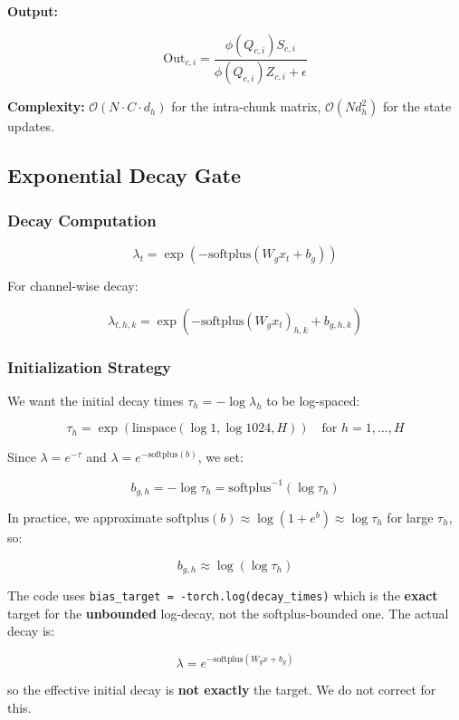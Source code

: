 \textbf{Output:}

\[
\text{Out}_{c, i} = \frac{\phi(Q_{c, i}) S_{c, i}}{\phi(Q_{c, i}) Z_{c, i} + \epsilon}
\tag{4.9}
\]

\textbf{Complexity:} $\mathcal{O}(N \cdot C \cdot d_h)$ for the intra-chunk matrix, 
$\mathcal{O}(N d_h^2)$ for the state updates.

\subsection{Exponential Decay Gate}

\subsubsection{Decay Computation}

\[
\lambda_t = \exp(-\text{softplus}(W_g x_t + b_g))
\tag{4.10}
\]

For channel-wise decay:

\[
\lambda_{t, h, k} = \exp(-\text{softplus}(W_g x_t)_{h, k} + b_{g, h, k})
\tag{4.11}
\]

\subsubsection{Initialization Strategy}

We want the initial decay times $\tau_{h} = -\log \lambda_h$ to be log-spaced:

\[
\tau_h = \exp\!\left(\text{linspace}(\log 1, \log 1024, H)\right) \quad \text{for } h = 1, \dots, H
\tag{4.12}
\]

Since $\lambda = e^{-\tau}$ and $\lambda = e^{-\text{softplus}(b)}$, we set:

\[
b_{g, h} = -\log \tau_h = \text{softplus}^{-1}(\log \tau_h)
\tag{4.13}
\]

In practice, we approximate $\text{softplus}(b) \approx \log(1 + e^b) \approx \log \tau_h$ for large $\tau_h$, so:

\[
b_{g, h} \approx \log(\log \tau_h)
\tag{4.14}
\]

The code uses \texttt{bias\_target = -torch.log(decay\_times)} which is the 
\textbf{exact} target for the \textbf{unbounded} log-decay, not the softplus-bounded one. The actual decay is:

\[
\lambda = e^{-\text{softplus}(W_g x + b_g)}
\]

so the effective initial decay is \textbf{not exactly} the target. We do not 
correct for this.

